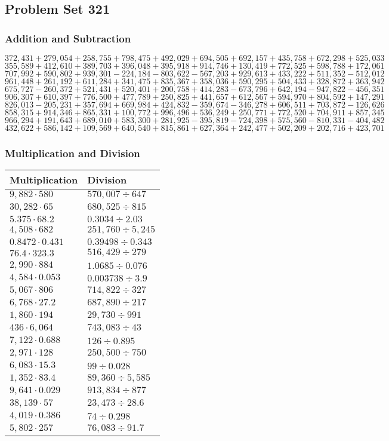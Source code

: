 \hypertarget{problem-set-321}{%
\subsection{Problem Set 321}\label{problem-set-321}}

\hypertarget{addition-and-subtraction}{%
\subsubsection{Addition and
Subtraction}\label{addition-and-subtraction}}

\(372,431+279,054+258,755+798,475+492,029+694,505+692,157+435,758+672,298+525,033\)
\(355,589+412,610+389,703+396,048+395,918+914,746+130,419+772,525+598,788+172,061\)
\(707,992+590,802+939,301-224,184-803,622-567,203+929,613+433,222+511,352-512,012\)
\(961,448+261,192+611,284+341,475+835,367+358,036+590,295+504,433+328,872+363,942\)
\(675,727-260,372+521,431+520,401+200,758+414,283-673,796+642,194-947,822-456,351\)
\(906,307+610,397+776,500+477,789+250,825+441,657+612,567+594,970+804,592+147,291\)
\(826,013-205,231+357,694+669,984+424,832-359,674-346,278+606,511+703,872-126,626\)
\(858,315+914,346+865,331+100,772+996,496+536,249+250,771+772,520+704,911+857,345\)
\(966,294+191,643+689,010+583,300+281,925-395,819-724,398+575,560-810,331-404,482\)
\(432,622+586,142+109,569+640,540+815,861+627,364+242,477+502,209+202,716+423,701\)

\hypertarget{multiplication-and-division}{%
\subsubsection{Multiplication and
Division}\label{multiplication-and-division}}

\begin{longtable}[]{@{}ll@{}}
\toprule
Multiplication & Division\tabularnewline
\midrule
\endhead
\(9,882\cdot580\) & \(570,007÷647\)\tabularnewline
\(30,282\cdot65\) & \(680,525÷815\)\tabularnewline
\(5.375\cdot68.2\) & \(0.3034÷2.03\)\tabularnewline
\(4,508\cdot682\) & \(251,760÷5,245\)\tabularnewline
\(0.8472\cdot0.431\) & \(0.39498÷0.343\)\tabularnewline
\(76.4\cdot323.3\) & \(516,429÷279\)\tabularnewline
\(2,990\cdot884\) & \(1.0685÷0.076\)\tabularnewline
\(4,584\cdot0.053\) & \(0.003738÷3.9\)\tabularnewline
\(5,067\cdot806\) & \(714,822÷327\)\tabularnewline
\(6,768\cdot27.2\) & \(687,890÷217\)\tabularnewline
\(1,860\cdot194\) & \(29,730÷991\)\tabularnewline
\(436\cdot6,064\) & \(743,083÷43\)\tabularnewline
\(7,122\cdot0.688\) & \(126÷0.895\)\tabularnewline
\(2,971\cdot128\) & \(250,500÷750\)\tabularnewline
\(6,083\cdot15.3\) & \(99÷0.028\)\tabularnewline
\(1,352\cdot83.4\) & \(89,360÷5,585\)\tabularnewline
\(9,641\cdot0.029\) & \(913,834÷877\)\tabularnewline
\(38,139\cdot57\) & \(23,473÷28.6\)\tabularnewline
\(4,019\cdot0.386\) & \(74÷0.298\)\tabularnewline
\(5,802\cdot257\) & \(76,083÷91.7\)\tabularnewline
\bottomrule
\end{longtable}
